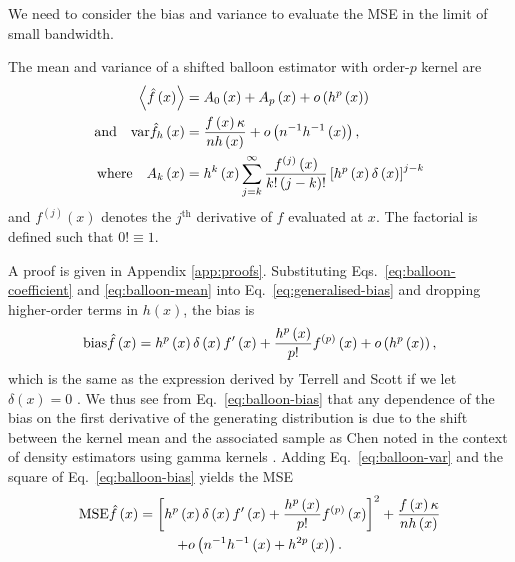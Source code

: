 We need to consider the bias and variance to evaluate the MSE in the limit of small bandwidth.
\begin{thm}
\label{thm:balloon-moments} The mean and variance of a shifted balloon estimator with order-$p$ kernel are 
\begin{align}
\left\langle \hat{f}\left(x\right)\right\rangle  & =A_{0}\left(x\right)+A_{p}\left(x\right)+o\left(h^{p}\left(x\right)\right)\label{eq:balloon-mean}\\
\text{and}\quad\mathrm{var}\hat{f}_{h}\left(x\right) & =\frac{f\left(x\right)\kappa}{nh\left(x\right)}+o\left(n^{-1}h^{-1}\left(x\right)\right),\label{eq:balloon-var}\\
\text{where}\quad A_{k}\left(x\right) & =h^{k}\left(x\right)\sum_{j=k}^{\infty}\frac{f^{\left(j\right)}\left(x\right)}{k!\left(j-k\right)!}\left[h^{p}\left(x\right)\delta\left(x\right)\right]^{j-k}\label{eq:balloon-coefficient}
\end{align}
and $f^{(j)}(x)$ denotes the $j^{\text{th}}$ derivative of $f$ evaluated at $x$. The factorial is defined such that $0!\equiv1$.
\end{thm}
A proof is given in Appendix \ref{app:proofs}. Substituting Eqs.~\eqref{eq:balloon-coefficient} and \eqref{eq:balloon-mean} into Eq.~\eqref{eq:generalised-bias} and dropping higher-order terms in $h\left(x\right)$, the bias is 
\begin{equation}
\mathrm{bias}\hat{f}\left(x\right)=h^{p}\left(x\right)\delta\left(x\right)f'\left(x\right)+\frac{h^{p}\left(x\right)}{p!}f^{\left(p\right)}\left(x\right)+o\left(h^{p}\left(x\right)\right),\label{eq:balloon-bias}
\end{equation}
which is the same as the expression derived by Terrell and Scott if we let $\delta\left(x\right)=0$ \cite{Terrell1992}. We thus see from Eq.~\eqref{eq:balloon-bias} that any dependence of the bias on the first derivative of the generating distribution is due to the shift between the kernel mean and the associated sample as Chen noted in the context of density estimators using gamma kernels \cite{Chen2000}. Adding Eq.~\eqref{eq:balloon-var} and the square of Eq.~\eqref{eq:balloon-bias} yields the MSE
\begin{multline*}
\mathrm{MSE}\hat{f}\left(x\right)=\left[h^{p}\left(x\right)\delta\left(x\right)f'\left(x\right)+\frac{h^{p}\left(x\right)}{p!}f^{\left(p\right)}\left(x\right)\right]^{2}+\frac{f\left(x\right)\kappa}{nh\left(x\right)}\\
+o\left(n^{-1}h^{-1}\left(x\right)+h^{2p}\left(x\right)\right).
\end{multline*}



